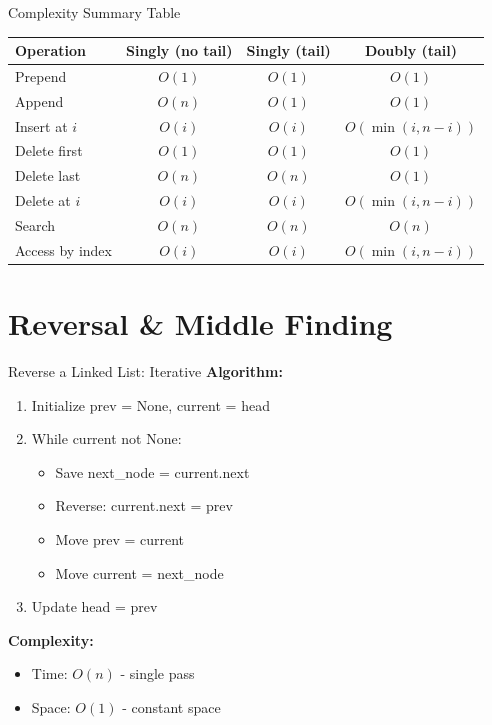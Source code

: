 \documentclass[aspectratio=169,xcolor=dvipsnames]{beamer}
\begin{document}
\begin{frame}{Complexity Summary Table}
  \begin{table}
    \centering
    \small
    \begin{tabular}{lccc}
      \hline
      \textbf{Operation} & \textbf{Singly (no tail)} & \textbf{Singly (tail)} & \textbf{Doubly (tail)} \\
      \hline
      Prepend & $O(1)$ & $O(1)$ & $O(1)$ \\
      Append & $O(n)$ & $O(1)$ & $O(1)$ \\
      Insert at $i$ & $O(i)$ & $O(i)$ & $O(\min(i, n-i))$ \\
      Delete first & $O(1)$ & $O(1)$ & $O(1)$ \\
      Delete last & $O(n)$ & $O(n)$ & $O(1)$ \\
      Delete at $i$ & $O(i)$ & $O(i)$ & $O(\min(i, n-i))$ \\
      Search & $O(n)$ & $O(n)$ & $O(n)$ \\
      Access by index & $O(i)$ & $O(i)$ & $O(\min(i, n-i))$ \\
      \hline
    \end{tabular}
  \end{table}
\end{frame}

\section{Reversal \& Middle Finding}

\begin{frame}{Reverse a Linked List: Iterative}
  \textbf{Algorithm:}
  \begin{enumerate}
    \item Initialize prev = None, current = head
    \item While current not None:
    \begin{itemize}
      \item Save next\_node = current.next
      \item Reverse: current.next = prev
      \item Move prev = current
      \item Move current = next\_node
    \end{itemize}
    \item Update head = prev
  \end{enumerate}

  \vspace{0.3cm}
  \textbf{Complexity:}
  \begin{itemize}
    \item Time: $O(n)$ - single pass
    \item Space: $O(1)$ - constant space
  \end{itemize}
\end{frame}
\end{document}
